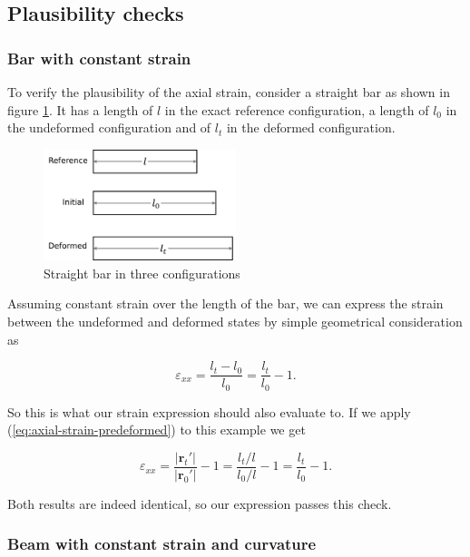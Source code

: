 \subsection{Plausibility checks}

\subsubsection{Bar with constant strain}

To verify the plausibility of the axial strain, consider a straight bar as shown in figure \ref{fig:beam-kinematics-verification-1}.
It has a length of $l$ in the exact reference configuration, a length of $l_{0}$ in the undeformed configuration and of $l_{t}$ in the deformed configuration.

\begin{figure}[h]
\centering
\includegraphics[width=0.5\textwidth]{figures/elements/beam-kinematics-verification-1}
\caption{Straight bar in three configurations}
\label{fig:beam-kinematics-verification-1}
\end{figure}

Assuming constant strain over the length of the bar, we can express the strain between the undeformed and deformed states by simple geometrical consideration as

\begin{equation}
\varepsilon_{xx} = \frac{l_{t} - l_{0}}{l_{0}} = \frac{l_{t}}{l_{0}} - 1.
\end{equation}

So this is what our strain expression should also evaluate to.
If we apply (\ref{eq:axial-strain-predeformed}) to this example we get

\begin{equation}
\varepsilon_{xx} = \frac{|\boldsymbol{r}_{t}'|}{|\boldsymbol{r}_{0}'|} - 1 = \frac{l_{t}/l}{l_{0}/l} - 1 = \frac{l_{t}}{l_{0}} - 1.
\end{equation}

Both results are indeed identical, so our expression passes this check.

\subsubsection{Beam with constant strain and curvature}

